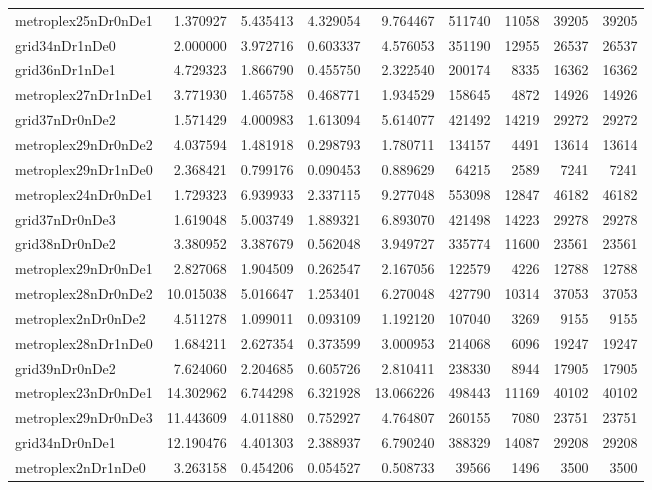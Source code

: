 \begin{longtable}{|l|r|r|r|r|r|r|r|r|}
metroplex25nDr0nDe1 & 1.370927 & 5.435413 & 4.329054 & 9.764467 & 511740 & 11058 & 39205 & 39205 \\
grid34nDr1nDe0 & 2.000000 & 3.972716 & 0.603337 & 4.576053 & 351190 & 12955 & 26537 & 26537 \\
grid36nDr1nDe1 & 4.729323 & 1.866790 & 0.455750 & 2.322540 & 200174 & 8335 & 16362 & 16362 \\
metroplex27nDr1nDe1 & 3.771930 & 1.465758 & 0.468771 & 1.934529 & 158645 & 4872 & 14926 & 14926 \\
grid37nDr0nDe2 & 1.571429 & 4.000983 & 1.613094 & 5.614077 & 421492 & 14219 & 29272 & 29272 \\
metroplex29nDr0nDe2 & 4.037594 & 1.481918 & 0.298793 & 1.780711 & 134157 & 4491 & 13614 & 13614 \\
metroplex29nDr1nDe0 & 2.368421 & 0.799176 & 0.090453 & 0.889629 & 64215 & 2589 & 7241 & 7241 \\
metroplex24nDr0nDe1 & 1.729323 & 6.939933 & 2.337115 & 9.277048 & 553098 & 12847 & 46182 & 46182 \\
grid37nDr0nDe3 & 1.619048 & 5.003749 & 1.889321 & 6.893070 & 421498 & 14223 & 29278 & 29278 \\
grid38nDr0nDe2 & 3.380952 & 3.387679 & 0.562048 & 3.949727 & 335774 & 11600 & 23561 & 23561 \\
metroplex29nDr0nDe1 & 2.827068 & 1.904509 & 0.262547 & 2.167056 & 122579 & 4226 & 12788 & 12788 \\
metroplex28nDr0nDe2 & 10.015038 & 5.016647 & 1.253401 & 6.270048 & 427790 & 10314 & 37053 & 37053 \\
metroplex2nDr0nDe2 & 4.511278 & 1.099011 & 0.093109 & 1.192120 & 107040 & 3269 & 9155 & 9155 \\
metroplex28nDr1nDe0 & 1.684211 & 2.627354 & 0.373599 & 3.000953 & 214068 & 6096 & 19247 & 19247 \\
grid39nDr0nDe2 & 7.624060 & 2.204685 & 0.605726 & 2.810411 & 238330 & 8944 & 17905 & 17905 \\
metroplex23nDr0nDe1 & 14.302962 & 6.744298 & 6.321928 & 13.066226 & 498443 & 11169 & 40102 & 40102 \\
metroplex29nDr0nDe3 & 11.443609 & 4.011880 & 0.752927 & 4.764807 & 260155 & 7080 & 23751 & 23751 \\
grid34nDr0nDe1 & 12.190476 & 4.401303 & 2.388937 & 6.790240 & 388329 & 14087 & 29208 & 29208 \\
metroplex2nDr1nDe0 & 3.263158 & 0.454206 & 0.054527 & 0.508733 & 39566 & 1496 & 3500 & 3500 \\

\end{longtable}
